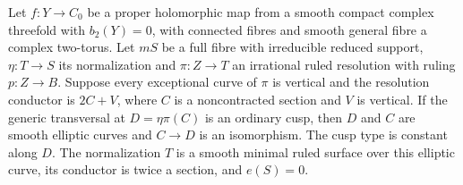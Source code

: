 \begin{proposition}\hypertarget{tag-01BB}{}\label{cdp:st:A.5.20}

Let $f:Y\to C_0$ be a proper holomorphic map from a smooth
compact complex threefold with $b_2(Y)=0$, with connected
fibres and smooth general fibre a complex two-torus.
Let $mS$ be a full fibre with irreducible reduced support,
$\eta:T\to S$ its normalization and $\pi:Z\to T$ an
irrational ruled resolution with ruling $p:Z\to B$.
Suppose every exceptional curve of $\pi$ is vertical
and the resolution conductor is $2C+V$, where $C$
is a noncontracted section and $V$ is vertical.
If the generic transversal at $D=\eta\pi(C)$ is an
ordinary cusp, then $D$ and $C$ are smooth elliptic
curves and $C\to D$ is an isomorphism. The cusp type
is constant along $D$. The normalization $T$ is a
smooth minimal ruled surface over this elliptic curve,
its conductor is twice a section, and $e(S)=0$.
\end{proposition}


